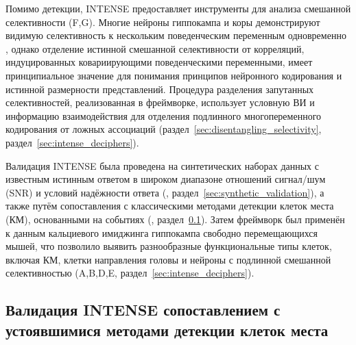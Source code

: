 Помимо детекции, INTENSE предоставляет инструменты для анализа смешанной селективности
(F,G). Многие нейроны гиппокампа и коры демонстрируют видимую
селективность к нескольким поведенческим переменным одновременно \cite{mix2,mix3}, однако отделение
истинной смешанной селективности от корреляций, индуцированных ковариирующими поведенческими переменными, имеет принципиальное значение
для понимания принципов нейронного кодирования и истинной размерности
представлений. Процедура разделения запутанных селективностей, реализованная в фреймворке, использует условную ВИ и информацию взаимодействия \cite{ghassami2017} для отделения подлинного многопеременного кодирования от
ложных ассоциаций (раздел~\ref{sec:disentangling_selectivity},
раздел~\ref{sec:intense_deciphers}).

Валидация INTENSE была проведена на синтетических наборах данных с известным истинным ответом в широком
диапазоне отношений сигнал/шум (SNR) и условий надёжности ответа
(, раздел~\ref{sec:synthetic_validation}), а также путём сопоставления
с классическими методами детекции клеток места (КМ), основанными на событиях
(, раздел~\ref{sec:intense_validates}). Затем фреймворк был применён к данным
кальциевого имиджинга гиппокампа свободно перемещающихся мышей, что позволило выявить разнообразные
функциональные типы клеток, включая КМ, клетки направления головы и нейроны с
подлинной смешанной селективностью (A,B,D,E,
раздел~\ref{sec:intense_deciphers}).


\subsection{Валидация INTENSE сопоставлением с устоявшимися методами детекции клеток места}
\label{sec:intense_validates}

